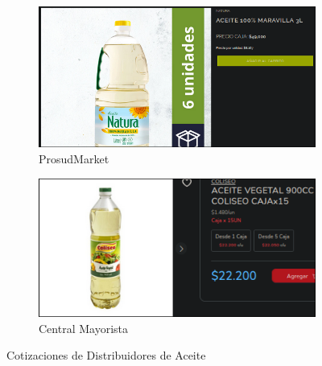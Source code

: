 \documentclass[12pt]{article}
\begin{document}
        \begin{figure}[H] %
            \centering
            \begin{subfigure}{0.45\textwidth}
                \centering
                \includegraphics[width=0.9\linewidth]{prosud} %
                \caption{ProsudMarket}
                \label{fig:prosudmarket}
            \end{subfigure}
            \hfill
            \begin{subfigure}{0.46\textwidth}
                \centering
                \includegraphics[width=0.9\linewidth]{aceite} %
                \caption{Central Mayorista}
                \label{fig:central_mayorista_aceite}
            \end{subfigure}
            \caption{Cotizaciones de Distribuidores de Aceite}
            \label{fig:cotizaciones_aceite}
        \end{figure} %
\end{document}

